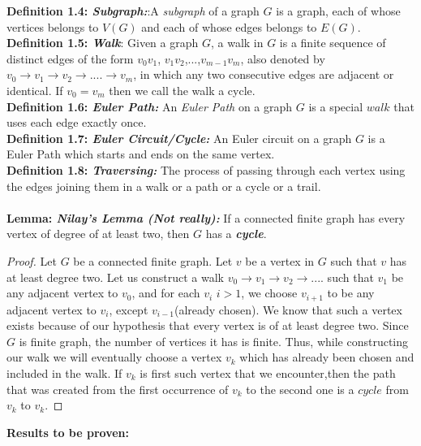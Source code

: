 \documentclass[12pt, fullpage]{article}
\begin{document}
\textbf{Definition 1.4: \textit{Subgraph:}}:A \textit{subgraph} of a graph $G$ is a graph, each of whose vertices belongs to $V(G)$ and each of whose edges belongs to $E(G)$.\\

\textbf{Definition 1.5: \textit{Walk}}: Given a graph $G$, a walk in $G$ is a finite sequence of distinct edges of the form $v_0v_1$, $v_1v_2$,...,$v_{m-1}v_m$, also denoted by $v_0 \rightarrow v_1 \rightarrow v_2 \rightarrow ....\rightarrow v_m$, in which any two consecutive edges are adjacent or identical.  If $v_0 = v_m$ then we call the walk a cycle.\\

\textbf{Definition 1.6: \textit{Euler Path: }}An \textit{Euler Path} on a graph $G$ is a special $walk$ that uses each edge exactly once.\\

\textbf{Definition 1.7: \textit{Euler Circuit/Cycle: }}An Euler circuit on a graph $G$ is a Euler Path which starts and ends on the same vertex.\\

\textbf{Definition 1.8: \textit{Traversing: }}The process of passing through each vertex using the edges joining them in a walk or a path or a cycle or a trail.\\ \\

\textbf{Lemma: \textit{Nilay's Lemma (Not really):}} If a connected finite graph has every vertex of degree of at least two, then $G$ has a \textit{\textbf{cycle}}.
\begin{proof}
Let $G$ be a connected finite graph. Let $v$ be a vertex in $G$ such that $v$ has at least degree two. Let us construct a walk $v_0 \rightarrow v_1 \rightarrow v_2 \rightarrow ....$ such that $v_1$ be any adjacent vertex to $v_0$, and for each $v_i$ $i > 1$, we choose $v_{i+1}$ to be any adjacent vertex to $v_i$, except $v_{i-1}$(already chosen). We know that such a vertex exists because of our hypothesis that every vertex is of at least degree two. Since $G$ is finite graph, the number of vertices it has is finite. Thus, while constructing our walk we will eventually choose a vertex $v_k$ which has already been chosen and included in the walk. If $v_k$ is first such vertex that we encounter,then the path that was created from the first occurrence of $v_k$ to the second one is a $cycle$ from $v_k$ to $v_k$.
\end{proof}

\textbf{Results to be proven: }
\end{document}
